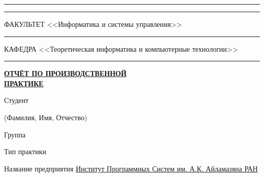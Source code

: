 \documentclass[14pt, russian]{scrartcl}
\begin{document}
\begin{titlepage}
\vspace{-2pt}
\hspace{-34.5pt}\rule{\textwidth}{0.5pt}

\vspace*{-18.3pt}
\hspace{-34.5pt}\rule{\textwidth}{2.5pt}
 
\vspace{0.5ex}
\noindent \small ФАКУЛЬТЕТ\hspace{80pt} <<Информатика и системы управления>>

\vspace*{-16pt}
\hspace{35pt}\rule{0.855\textwidth}{0.4pt}

\vspace{0.5ex}
\noindent \small КАФЕДРА\hspace{50pt} <<Теоретическая информатика и компьютерные технологии>>

\vspace*{-16pt}
\hspace{25pt}\rule{0.875\textwidth}{0.4pt}
 
 
\vspace{3em}
 
\begin{center}
\Large {\textbf{\uline{ОТЧЁТ ПО ПРОИЗВОДСТВЕННОЙ}}} \\ {\textbf{\uline{ПРАКТИКЕ}}}
\end{center}\normalsize

\vspace{2ex}
\noindent Студент \underline{\hspace{406pt}}

\vspace{-2.1ex}
\noindent\hspace{31ex}\scriptsize{(Фамилия, Имя, Отчество)}\normalsize

\vspace{0.7ex}
\noindent Группа \underline{\hspace{50pt}}
 
\vspace{2ex}
\noindent Тип практики \underline{\hspace{373pt}}

\vspace{2.5ex}
\noindent Название предприятия \underline{\hspace{16pt}\footnotesize Институт Программных Систем им. А.К. Айламазяна РАН\hspace{12pt}}\normalsize


\end{titlepage}
\end{document}
